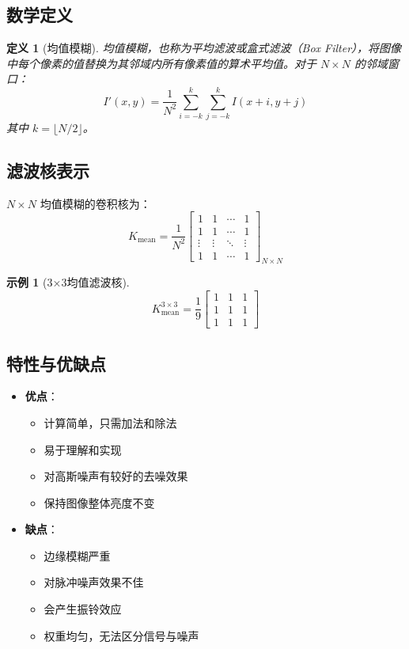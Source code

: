 \documentclass{article}
\newtheorem{definition}{定义}[section]
\newtheorem{example}{示例}[section]
\begin{document}
\subsection{数学定义}

\begin{definition}[均值模糊]
均值模糊，也称为平均滤波或盒式滤波（Box Filter），将图像中每个像素的值替换为其邻域内所有像素值的算术平均值。对于 $N \times N$ 的邻域窗口：
\[
I'(x,y) = \frac{1}{N^2} \sum_{i=-k}^{k} \sum_{j=-k}^{k} I(x+i, y+j)
\]
其中 $k = \lfloor N/2 \rfloor$。
\end{definition}

\subsection{滤波核表示}
$N \times N$ 均值模糊的卷积核为：
\[
K_{\text{mean}} = \frac{1}{N^2} \begin{bmatrix}
1 & 1 & \cdots & 1 \\
1 & 1 & \cdots & 1 \\
\vdots & \vdots & \ddots & \vdots \\
1 & 1 & \cdots & 1
\end{bmatrix}_{N \times N}
\]

\begin{example}[3×3均值滤波核]
\[
K_{\text{mean}}^{3\times3} = \frac{1}{9} \begin{bmatrix}
1 & 1 & 1 \\
1 & 1 & 1 \\
1 & 1 & 1
\end{bmatrix}
\]
\end{example}

\subsection{特性与优缺点}

\begin{itemize}
    \item \textbf{优点}：
    \begin{itemize}
        \item 计算简单，只需加法和除法
        \item 易于理解和实现
        \item 对高斯噪声有较好的去噪效果
        \item 保持图像整体亮度不变
    \end{itemize}

    \item \textbf{缺点}：
    \begin{itemize}
        \item 边缘模糊严重
        \item 对脉冲噪声效果不佳
        \item 会产生振铃效应
        \item 权重均匀，无法区分信号与噪声
    \end{itemize}
\end{itemize}
\end{document}
